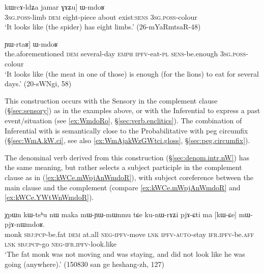\begin{exe}
	\ex \label{ex:GAZu.WmdoR}
	\gll [ɯ-mɤlɤjaʁ nɯ, [...] kɯrcɤ-ldʑa jamar ɣɤʑu] ɯ-mdoʁ \\
	\textsc{3sg}.\textsc{poss}-limb \textsc{dem} { } eight-piece about exist:\textsc{sens} \textsc{3sg}.\textsc{poss}-colour \\
	\glt `It looks like (the spider) has eight limbs.' (26-mYaRmtsaR-48)
\end{exe}

\begin{exe}
	\ex \label{ex:YWrtaR.WmdoR}
	\gll    [iɕqʰa nɯ [kɤntɕʰɯ-sŋi ʑo tu-ndza-nɯ] ɲɯ-rtaʁ] ɯ-mdoʁ  \\
	the.aforementioned \textsc{dem} several-day \textsc{emph} \textsc{ipfv}-eat-\textsc{pl} \textsc{sens}-be.enough \textsc{3sg}.\textsc{poss}-colour \\
	\glt `It looks like (the meat in one of those) is enough (for the lions) to eat for several days.' (20-sWNgi, 58)
\end{exe}

This construction occurs with the Sensory in the complement clause (§\ref{sec:sensory}) as in the examples above, or with the Inferential to express a past event/situation (see \ref{ex:WmdoRo}, §\ref{sec:verb.enclitics}). The combination of Inferential with  is semantically close to the Probabilitative with peg circumfix (§\ref{sec:WmA.kW.ci}, see also \ref{ex:WmAjakWzGWtci.gloss}, §\ref{sec:peg.circumfix}).

The denominal verb   derived from this construction (§\ref{sec:denom.intr.nW}) has the same meaning, but rather selects a subject participle in the complement clause as in (\ref{ex:kWCe.mWpjAnWmdoR}), with subject coreference between the main clause and the complement (compare \ref{ex:kWCe.mWpjAnWmdoR} and \ref{ex:kWCe.YWtWnWmdoR}).


\begin{exe}
	\ex \label{ex:kWCe.mWpjAnWmdoR}
	\gll  χpɯn kɯ-tsʰu nɯ maka mɯ-ɲɯ-mɯnmu tɕe ku-nɯ-rɤʑi pjɤ-ɕti ma [kɯ-ɕe] mɯ-pjɤ-nɯmdoʁ. \\
	monk \textsc{sbj}:\textsc{pcp}-be.fat \textsc{dem} at.all \textsc{neg}-\textsc{ipfv}-move \textsc{lnk} \textsc{ipfv}-\textsc{auto}-stay \textsc{ifr}.\textsc{ipfv}-be.\textsc{aff} \textsc{lnk} \textsc{sbj}:\textsc{pcp}-go \textsc{neg}-\textsc{ifr}.\textsc{ipfv}-look.like \\
	\glt `The fat monk was not moving and was staying, and did not look like he was going (anywhere).'  (150830 san ge heshang-zh, 127)
\end{exe}

